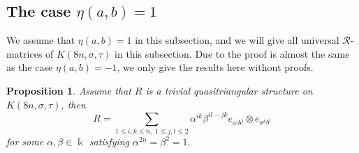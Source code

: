 \documentclass[a4paper,11pt]{amsart}
\numberwithin{equation}{section}
\newtheorem{proposition}[theorem]{Proposition}
\begin{document}
\subsection{The case $\eta(a,b)=1$}\label{sec4.4}
We assume that $\eta(a,b)=1$ in this subsection, and we will give all universal $\mathcal{R}$-matrices of $K(8n,\sigma,\tau)$ in this subsection. Due to the proof is almost the same as the case $\eta(a,b)=-1$, we only give the results here without proofs.

\begin{proposition}
Assume that $R$ is a trivial quasitriangular structure on $K(8n,\sigma,\tau)$, then $$R=\sum_{1\leq i,k \leq n,\;1\leq j,l \leq 2}\alpha^{ik}\beta^{il-jk}e_{a^ib^j} \otimes e_{a^kb^l}$$ for some $\alpha, \beta\in \Bbbk$ satisfying $\alpha^{2n}=\beta^2=1.$
\end{proposition}
\end{document}
